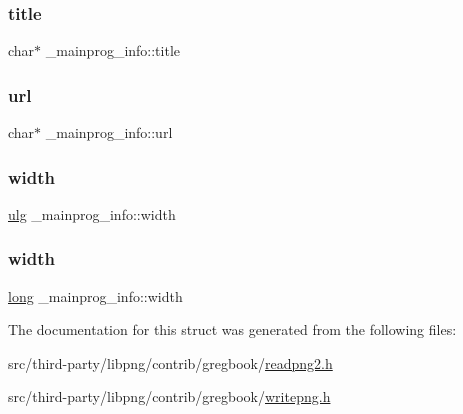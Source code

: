 \subsubsection{\texorpdfstring{title}{title}}
{\footnotesize\ttfamily char$\ast$ \+\_\+mainprog\+\_\+info\+::title}

\mbox{\label{struct__mainprog__info_ab9a52438e6e7d09d7f103dfc489875fa}} 
\subsubsection{\texorpdfstring{url}{url}}
{\footnotesize\ttfamily char$\ast$ \+\_\+mainprog\+\_\+info\+::url}

\mbox{\label{struct__mainprog__info_a83eef09db07997f02e0e612663c23336}} 
\subsubsection{\texorpdfstring{width}{width}\hspace{0.1cm}{\footnotesize\ttfamily [1/2]}}
{\footnotesize\ttfamily \mbox{\hyperlink{readpng_8h_abd6f60bf9450af2ecb94097a32c19a64}{ulg}} \+\_\+mainprog\+\_\+info\+::width}

\mbox{\label{struct__mainprog__info_a5b0e61ea9e6c2a99af08d580e5d2a8d1}} 
\subsubsection{\texorpdfstring{width}{width}\hspace{0.1cm}{\footnotesize\ttfamily [2/2]}}
{\footnotesize\ttfamily \mbox{\hyperlink{ioapi_8h_a3c7b35ad9dab18b8310343c201f7b27e}{long}} \+\_\+mainprog\+\_\+info\+::width}



The documentation for this struct was generated from the following files\+:\begin{DoxyCompactItemize}
\item 
src/third-\/party/libpng/contrib/gregbook/\mbox{\hyperlink{readpng2_8h}{readpng2.\+h}}\item 
src/third-\/party/libpng/contrib/gregbook/\mbox{\hyperlink{writepng_8h}{writepng.\+h}}\end{DoxyCompactItemize}
